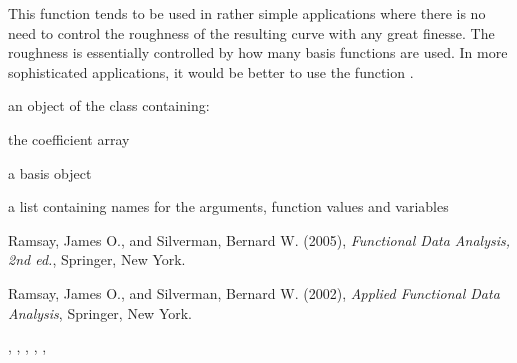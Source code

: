 \begin{Details}\relax
This function tends to be used in rather simple applications where
there is no need to control the roughness of the resulting curve with
any great finesse.  The roughness is essentially controlled by how
many basis functions are used.  In more sophisticated applications, it
would be better to use the function .
\end{Details}
\begin{Value}
an object of the  class containing:

\begin{ldescription}
\item[\code{coefs}] the coefficient array

\item[\code{basis}] a basis object 

\item[\code{fdnames}] a list containing names for the arguments, function values
and variables

\end{ldescription}
\end{Value}
\begin{References}\relax
Ramsay, James O., and Silverman, Bernard W. (2005), \emph{Functional 
Data Analysis, 2nd ed.}, Springer, New York. 

Ramsay, James O., and Silverman, Bernard W. (2002), \emph{Applied
Functional Data Analysis}, Springer, New York.
\end{References}
\begin{SeeAlso}\relax
{}, 
, 
, 
, 
, 
\end{SeeAlso}
